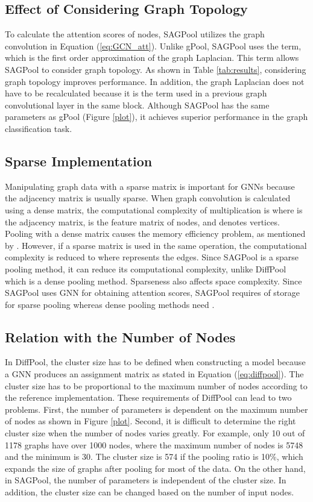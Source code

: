 \documentclass{article}
\begin{document}
\subsection{Effect of Considering Graph Topology}
\label{analysis:effect-topology}
To calculate the attention scores of nodes, SAGPool utilizes the graph convolution in Equation (\ref{eq:GCN_att}). Unlike gPool, SAGPool uses the  term, which is the first order approximation of the graph Laplacian. This term allows SAGPool to consider graph topology. As shown in Table \ref{tab:results}, considering graph topology improves performance. In addition, the graph Laplacian does not have to be recalculated because it is the term used in a previous graph convolutional layer in the same block. Although SAGPool has the same parameters as gPool (Figure \ref{plot}), it achieves superior performance in the graph classification task.

\subsection{Sparse Implementation}
\label{analysis:sparsity}
Manipulating graph data with a sparse matrix is important for GNNs because the adjacency matrix is usually sparse. When graph convolution is calculated using a dense matrix, the computational complexity of multiplication  is  where  is the adjacency matrix,  is the feature matrix of nodes, and  denotes vertices. Pooling with a dense matrix causes the memory efficiency problem, as mentioned by \cite{cangea2018towards}. However, if a sparse matrix is used in the same operation, the computational complexity is reduced to  where  represents the edges. Since SAGPool is a sparse pooling method, it can reduce its computational complexity, unlike DiffPool which is a dense pooling method. 
Sparseness also affects space complexity. Since SAGPool uses GNN for obtaining attention scores, SAGPool requires 
 of storage for sparse pooling whereas dense pooling methods need .


\subsection{Relation with the Number of Nodes}
\label{analysis:relation-num-nodes}
In DiffPool, the cluster size has to be defined when constructing a model because a GNN produces an assignment matrix  as stated in Equation (\ref{eq:diffpool}). The cluster size has to be proportional to the maximum number of nodes according to the reference implementation. These requirements of DiffPool can lead to two problems. 
First, the number of parameters is dependent on the maximum number of nodes as shown in Figure \ref{plot}. Second, it is difficult to determine the right cluster size when the number of nodes varies greatly. For example, only 10 out of 1178 graphs have over 1000 nodes, where the maximum number of nodes is 5748 and the minimum is 30. The cluster size is 574 if the pooling ratio is 10\%, which expands the size of graphs after pooling for most of the data. On the other hand, in SAGPool, the number of parameters is independent of the cluster size. In addition, the cluster size can be changed based on the number of input nodes.
\end{document}
